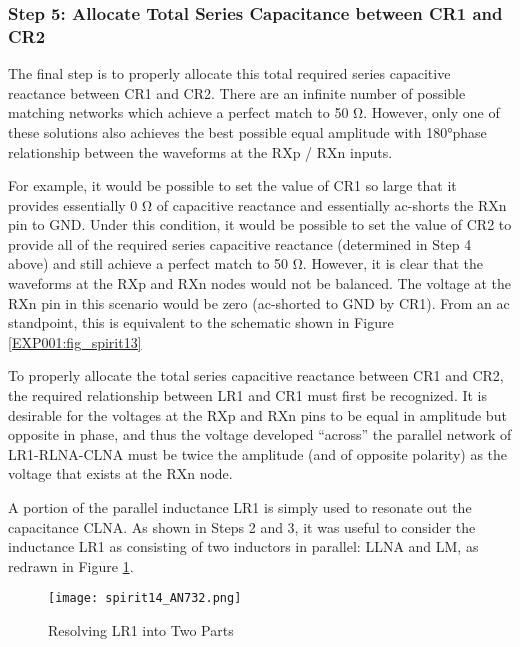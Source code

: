       \subsubsection{Step 5: Allocate Total Series Capacitance between CR1 and CR2}
        The final step is to properly allocate this total required series capacitive reactance between CR1 
        and CR2. There are an infinite number of possible matching networks which achieve a perfect match to 
        50 Ω. However, only one of these solutions also achieves the best possible equal amplitude with 
        180°phase relationship between the waveforms at the RXp / RXn inputs.
        
        For example, it would be possible to set the value of CR1 so large that it provides essentially 0 Ω 
        of capacitive reactance and essentially ac-shorts the RXn pin to GND. Under this condition, it would 
        be possible to set the value of CR2 to provide all of the required series capacitive reactance 
        (determined in Step 4 above) and still achieve a perfect match to 50 Ω. However, it is clear that 
        the waveforms at the RXp and RXn nodes would not be balanced. The voltage at the RXn pin in this 
        scenario would be zero (ac-shorted to GND by CR1). From an ac standpoint, this is equivalent to the 
        schematic shown in Figure \ref{EXP001:fig_spirit13}
        
        To properly allocate the total series capacitive reactance between CR1 and CR2, the required 
        relationship between LR1 and CR1 must first be recognized. It is desirable for the voltages at the 
        RXp and RXn pins to be equal in amplitude but opposite in phase, and thus the voltage developed 
        “across” the parallel network of LR1-RLNA-CLNA must be twice the amplitude (and of opposite polarity) 
        as the voltage that exists at the RXn node.
        
        A portion of the parallel inductance LR1 is simply used to resonate out the capacitance CLNA. As 
        shown in Steps 2 and 3, it was useful to consider the inductance LR1 as consisting of two inductors 
        in parallel: LLNA and LM, as redrawn in Figure \ref{EXP001:fig_spirit14}.
        
        \begin{figure}[ht!] %
          \centering
          \texttt{[image: spirit14\_AN732.png]}
          \caption{Resolving LR1 into Two Parts}
          \label{EXP001:fig_spirit14}
        \end{figure}
        
